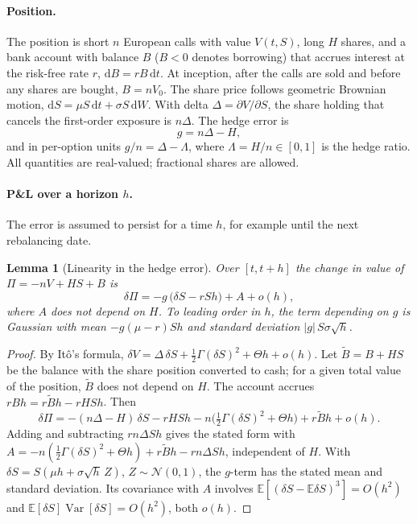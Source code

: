 \documentclass[11pt,a4paper]{article}
\newtheorem{lemma}{Lemma}
\theoremstyle{remark}
\newcommand{\E}{\mathbb{E}}
\newcommand{\Var}{\operatorname{Var}}
\newcommand{\dd}{\mathrm{d}}
\begin{document}
\paragraph{Position.} The position is short $n$ European calls with value $V(t,S)$, long $H$
shares, and a bank account with balance $B$ ($B<0$ denotes borrowing) that accrues interest
at the risk-free rate $r$, $\dd B = rB\,\dd t$. At inception, after the calls are sold and
before any shares are bought, $B = nV_0$. The share price follows
geometric Brownian motion, $\dd S = \mu S\,\dd t + \sigma S\,\dd W$. With delta
$\Delta = \partial V/\partial S$, the share holding that cancels the first-order exposure is
$n\Delta$. The hedge error is
\begin{equation}
  g = n\Delta - H ,
\end{equation}
and in per-option units $g/n = \Delta - \Lambda$, where $\Lambda = H/n\in[0,1]$ is the
hedge ratio. All quantities are real-valued; fractional shares are allowed.

\paragraph{P\&L over a horizon $h$.} The error is assumed to persist for a time $h$, for
example until the next rebalancing date.

\begin{lemma}[Linearity in the hedge error]\label{lem:pnl}
Over $[t,t+h]$ the change in value of $\Pi = -nV + HS + B$ is
\begin{equation}
  \delta\Pi = -g\,\bigl(\delta S - rS h\bigr) + A + o(h),
\end{equation}
where $A$ does not depend on $H$. To leading order in $h$, the term depending on $g$ is
Gaussian with mean $-g(\mu-r)Sh$ and standard deviation $|g|\,S\sigma\sqrt h$.
\end{lemma}

\begin{proof}
By It\^o's formula, $\delta V = \Delta\,\delta S + \tfrac12\Gamma(\delta S)^2 + \Theta h
+ o(h)$. Let $\tilde B = B + HS$ be the balance with the share position converted to
cash; for a given total value of the position, $\tilde B$ does not depend on $H$. The
account accrues $rBh = r\tilde Bh - rHSh$. Then
\[
  \delta\Pi = -(n\Delta - H)\,\delta S - rHSh - n\bigl(\tfrac12\Gamma(\delta S)^2
  + \Theta h\bigr) + r\tilde Bh + o(h).
\]
Adding and subtracting $rn\Delta Sh$ gives the stated form with
$A = -n(\tfrac12\Gamma(\delta S)^2 + \Theta h) + r\tilde Bh - rn\Delta Sh$, independent of $H$.
With $\delta S = S(\mu h + \sigma\sqrt h\,Z)$, $Z\sim\mathcal N(0,1)$, the $g$-term has the
stated mean and standard deviation. Its covariance with $A$ involves
$\E[(\delta S - \E\delta S)^3] = O(h^2)$ and $\E[\delta S]\Var[\delta S] = O(h^2)$, both
$o(h)$.
\end{proof}
\end{document}
